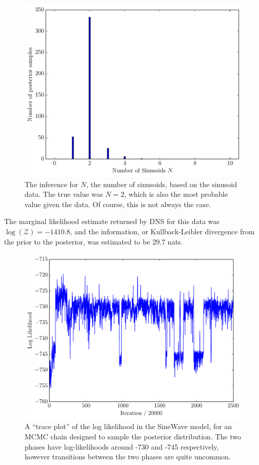 \documentclass[letterpaper, 11pt]{article}
\begin{document}
\begin{figure}
\begin{center}
\includegraphics[scale=0.5]{N_result.pdf}
\caption{The inference for $N$, the number of sinusoids, based on the
sinusoid data. The true value was $N=2$, which is also the most probable value
given the data. Of course, this is not always the case.
\label{fig:N_result}}
\end{center}
\end{figure}

The marginal likelihood estimate returned by DNS for this data was
$\log(\mathcal{Z}) = -1410.8$, and the information, or Kullback-Leibler
divergence from the prior to the posterior, was estimated to be 29.7 nats.

\begin{figure}
\begin{center}
\includegraphics[scale=0.5]{trace_logl.pdf}
\caption{A ``trace plot'' of the log likelihood in the SineWave model, for an
MCMC chain designed to sample the posterior distribution. The two phases
have log-likelihoods around -730 and -745 respectively, however transitions
between the two phases are quite uncommon.
\label{fig:trace_logl}}
\end{center}
\end{figure}
\end{document}
